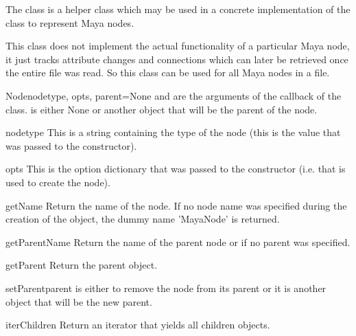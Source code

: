 The  class is a helper class which may be used in a
concrete implementation of the  class to represent 
Maya nodes.

This class does not implement the actual functionality of a particular
Maya node, it just tracks attribute changes and connections which can
later be retrieved once the entire file was read. So this class can be
used for all Maya nodes in a file.

\begin{classdesc}{Node}{nodetype, opts, parent=None}
   and  are the arguments of the 
   callback of the  class.
   is either None or another  object that will 
  be the parent of the node.
\end{classdesc}

\begin{memberdesc}{nodetype}
This is a string containing the type of the node (this is the value
that was passed to the constructor).
\end{memberdesc}

\begin{memberdesc}{opts}
This is the option dictionary that was passed to the constructor
(i.e. that is used to create the node).
\end{memberdesc}

\begin{methoddesc}{getName}{}
Return the name of the node. If no node name was specified during the
creation of the object, the dummy name 'MayaNode' is returned.
\end{methoddesc}

\begin{methoddesc}{getParentName}{}
Return the name of the parent node or  if no parent was specified.
\end{methoddesc}

\begin{methoddesc}{getParent}{}
Return the parent  object.
\end{methoddesc}

\begin{methoddesc}{setParent}{parent}
 is either  to remove the node from its parent
or it is another  object that will be the new parent.
\end{methoddesc}

\begin{methoddesc}{iterChildren}{}
Return an iterator that yields all children  objects.
\end{methoddesc}

